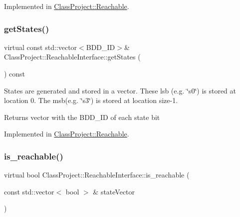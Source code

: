 Implemented in \hyperlink{classClassProject_1_1Reachable_ab382d204af0fe91f027026b6dad6142f}{Class\+Project\+::\+Reachable}.

\mbox{\label{classClassProject_1_1ReachableInterface_a8546499fbc6d0da61b6b21f8db8e4621}} 
\subsubsection{\texorpdfstring{get\+States()}{getStates()}}
{\footnotesize\ttfamily virtual const std\+::vector$<$B\+D\+D\+\_\+\+ID$>$\& Class\+Project\+::\+Reachable\+Interface\+::get\+States (\begin{DoxyParamCaption}{ }\end{DoxyParamCaption}) const\hspace{0.3cm}{\ttfamily [pure virtual]}}

States are generated and stored in a vector. These lsb (e.\+g. \char`\"{}s0\char`\"{}) is stored at location 0. The msb(e.\+g. \char`\"{}s3\char`\"{}) is stored at location size-\/1. \begin{DoxyReturn}{Returns}
vector with the B\+D\+D\+\_\+\+ID of each state bit 
\end{DoxyReturn}


Implemented in \hyperlink{classClassProject_1_1Reachable_a46b6aab8ea4dac374af4e2e97b5321dd}{Class\+Project\+::\+Reachable}.

\mbox{\label{classClassProject_1_1ReachableInterface_aa3011f06562431832cf563b77fb36c13}} 
\subsubsection{\texorpdfstring{is\+\_\+reachable()}{is\_reachable()}}
{\footnotesize\ttfamily virtual bool Class\+Project\+::\+Reachable\+Interface\+::is\+\_\+reachable (\begin{DoxyParamCaption}\item[{const std\+::vector$<$ bool $>$ \&}]{state\+Vector }\end{DoxyParamCaption})\hspace{0.3cm}{\ttfamily [pure virtual]}}


